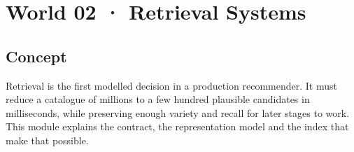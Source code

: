 \section{World 02 · Retrieval Systems}

\begin{abstract}
Preserve useful options under a strict latency budget; ranking can only work with what retrieval keeps.
\end{abstract}

\subsection{Concept}
Retrieval is the first modelled decision in a production recommender. It must reduce a catalogue of millions to a few hundred plausible candidates in milliseconds, while preserving enough variety and recall for later stages to work. This module explains the contract, the representation model and the index that make that possible.
